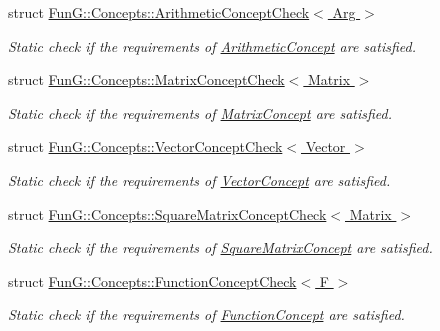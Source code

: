 \begin{DoxyCompactItemize}
struct \hyperlink{structFunG_1_1Concepts_1_1ArithmeticConceptCheck}{\-Fun\-G\-::\-Concepts\-::\-Arithmetic\-Concept\-Check$<$ Arg $>$}
\begin{DoxyCompactList}\small\item\em \-Static check if the requirements of \hyperlink{structFunG_1_1Concepts_1_1ArithmeticConcept}{\-Arithmetic\-Concept} are satisfied. \end{DoxyCompactList}\item 
struct \hyperlink{structFunG_1_1Concepts_1_1MatrixConceptCheck}{\-Fun\-G\-::\-Concepts\-::\-Matrix\-Concept\-Check$<$ Matrix $>$}
\begin{DoxyCompactList}\small\item\em \-Static check if the requirements of \hyperlink{structFunG_1_1Concepts_1_1MatrixConcept}{\-Matrix\-Concept} are satisfied. \end{DoxyCompactList}\item 
struct \hyperlink{structFunG_1_1Concepts_1_1VectorConceptCheck}{\-Fun\-G\-::\-Concepts\-::\-Vector\-Concept\-Check$<$ Vector $>$}
\begin{DoxyCompactList}\small\item\em \-Static check if the requirements of \hyperlink{structFunG_1_1Concepts_1_1VectorConcept}{\-Vector\-Concept} are satisfied. \end{DoxyCompactList}\item 
struct \hyperlink{structFunG_1_1Concepts_1_1SquareMatrixConceptCheck}{\-Fun\-G\-::\-Concepts\-::\-Square\-Matrix\-Concept\-Check$<$ Matrix $>$}
\begin{DoxyCompactList}\small\item\em \-Static check if the requirements of \hyperlink{structFunG_1_1Concepts_1_1SquareMatrixConcept}{\-Square\-Matrix\-Concept} are satisfied. \end{DoxyCompactList}\item 
struct \hyperlink{structFunG_1_1Concepts_1_1FunctionConceptCheck}{\-Fun\-G\-::\-Concepts\-::\-Function\-Concept\-Check$<$ F $>$}
\begin{DoxyCompactList}\small\item\em \-Static check if the requirements of \hyperlink{structFunG_1_1Concepts_1_1FunctionConcept}{\-Function\-Concept} are satisfied. \end{DoxyCompactList}\end{DoxyCompactItemize}
